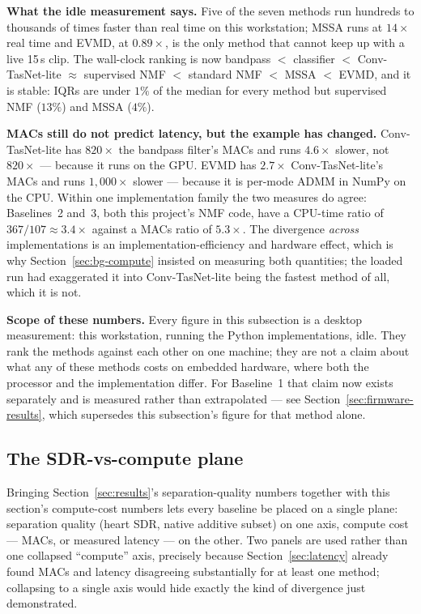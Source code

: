 \documentclass[11pt]{article}
\begin{document}
\textbf{What the idle measurement says.} Five of the seven methods run
hundreds to thousands of times faster than real time on this workstation;
MSSA runs at $14\times$ real time and EVMD, at $0.89\times$, is the only
method that cannot keep up with a live 15\,s clip. The wall-clock ranking
is now bandpass $<$ classifier $<$ Conv-TasNet-lite $\approx$ supervised
NMF $<$ standard NMF $<$ MSSA $<$ EVMD, and it is stable: IQRs are under
$1\%$ of the median for every method but supervised NMF ($13\%$) and
MSSA ($4\%$).

\textbf{MACs still do not predict latency, but the example has changed.}
Conv-TasNet-lite has $820\times$ the bandpass filter's MACs and runs
$4.6\times$ slower, not $820\times$ --- because it runs on the GPU. EVMD has
$2.7\times$ Conv-TasNet-lite's MACs and runs $1{,}000\times$ slower ---
because it is per-mode ADMM in NumPy on the CPU. Within one
implementation family the two measures do agree: Baselines~2 and~3, both
this project's NMF code, have a CPU-time ratio of $367/107 \approx
3.4\times$ against a MACs ratio of $5.3\times$. The divergence
\emph{across} implementations is an implementation-efficiency and
hardware effect, which is why Section~\ref{sec:bg-compute} insisted on
measuring both quantities; the loaded run had exaggerated it into
Conv-TasNet-lite being the fastest method of all, which it is not.

\textbf{Scope of these numbers.} Every figure in this subsection is a
desktop measurement: this workstation, running the Python implementations,
idle. They rank the methods against each other on one machine; they are
not a claim about what any of these methods costs on embedded hardware,
where both the processor and the implementation differ. For Baseline~1
that claim now exists separately and is measured rather than extrapolated
--- see Section~\ref{sec:firmware-results}, which supersedes this
subsection's figure for that method alone.

\subsection{The SDR-vs-compute plane}
\label{sec:compute-plane}

Bringing Section~\ref{sec:results}'s separation-quality numbers together
with this section's compute-cost numbers lets every baseline be placed on
a single plane: separation quality (heart SDR, native additive subset) on
one axis, compute cost --- MACs, or measured latency --- on the other.
Two panels are used rather than one collapsed ``compute'' axis, precisely
because Section~\ref{sec:latency} already found MACs and latency
disagreeing substantially for at least one method; collapsing to a single
axis would hide exactly the kind of divergence just demonstrated.
\end{document}
